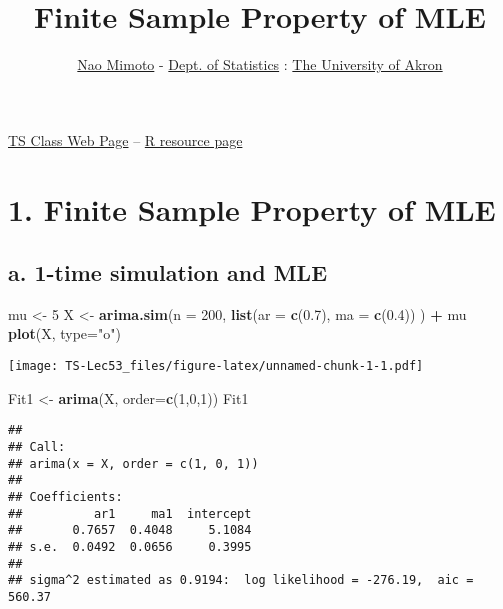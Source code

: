 \documentclass[]{article}
\title{Finite Sample Property of MLE}
\author{\href{https://nmimoto.github.io/}{Nao Mimoto} -
\href{http://www.uakron.edu/stat/}{Dept. of Statistics} :
\href{http://www.uakron.edu}{The University of Akron}}
\date{}
\newenvironment{Shaded}{\begin{snugshade}}{\end{snugshade}}
\newcommand{\DataTypeTok}[1]{\textcolor[rgb]{0.13,0.29,0.53}{#1}}
\newcommand{\DecValTok}[1]{\textcolor[rgb]{0.00,0.00,0.81}{#1}}
\newcommand{\FloatTok}[1]{\textcolor[rgb]{0.00,0.00,0.81}{#1}}
\newcommand{\KeywordTok}[1]{\textcolor[rgb]{0.13,0.29,0.53}{\textbf{#1}}}
\newcommand{\NormalTok}[1]{#1}
\newcommand{\OperatorTok}[1]{\textcolor[rgb]{0.81,0.36,0.00}{\textbf{#1}}}
\newcommand{\StringTok}[1]{\textcolor[rgb]{0.31,0.60,0.02}{#1}}
\begin{document}
\maketitle

{
\setcounter{tocdepth}{2}
\tableofcontents
}
\href{https://nmimoto.github.io/477/}{TS Class Web Page} --
\href{https://nmimoto.github.io/R/}{R resource page}

\hypertarget{finite-sample-property-of-mle}{%
\section{1. Finite Sample Property of
MLE}\label{finite-sample-property-of-mle}}

\hypertarget{a.-1-time-simulation-and-mle}{%
\subsection{a. 1-time simulation and
MLE}\label{a.-1-time-simulation-and-mle}}

\begin{Shaded}
\begin{Highlighting}[]
\NormalTok{  mu <-}\StringTok{ }\DecValTok{5}
\NormalTok{  X  <-}\StringTok{ }\KeywordTok{arima.sim}\NormalTok{(}\DataTypeTok{n =} \DecValTok{200}\NormalTok{, }\KeywordTok{list}\NormalTok{(}\DataTypeTok{ar =} \KeywordTok{c}\NormalTok{(}\FloatTok{0.7}\NormalTok{), }\DataTypeTok{ma =} \KeywordTok{c}\NormalTok{(}\FloatTok{0.4}\NormalTok{)) ) }\OperatorTok{+}\StringTok{ }\NormalTok{mu}
  \KeywordTok{plot}\NormalTok{(X, }\DataTypeTok{type=}\StringTok{"o"}\NormalTok{)}
\end{Highlighting}
\end{Shaded}

\texttt{[image: TS-Lec53\_files/figure-latex/unnamed-chunk-1-1.pdf]}

\begin{Shaded}
\begin{Highlighting}[]
\NormalTok{  Fit1 <-}\StringTok{ }\KeywordTok{arima}\NormalTok{(X, }\DataTypeTok{order=}\KeywordTok{c}\NormalTok{(}\DecValTok{1}\NormalTok{,}\DecValTok{0}\NormalTok{,}\DecValTok{1}\NormalTok{))}
\NormalTok{  Fit1}
\end{Highlighting}
\end{Shaded}

\begin{verbatim}
## 
## Call:
## arima(x = X, order = c(1, 0, 1))
## 
## Coefficients:
##          ar1     ma1  intercept
##       0.7657  0.4048     5.1084
## s.e.  0.0492  0.0656     0.3995
## 
## sigma^2 estimated as 0.9194:  log likelihood = -276.19,  aic = 560.37
\end{verbatim}
\end{document}
